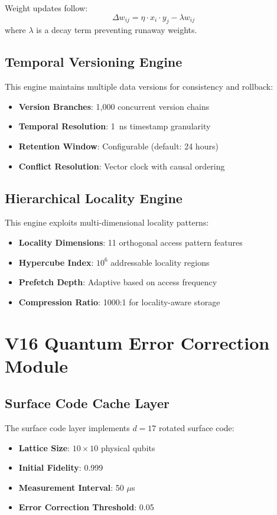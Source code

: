 \documentclass[12pt,a4paper]{article}
\theoremstyle{definition}
\begin{document}
Weight updates follow:
\begin{equation}
\Delta w_{ij} = \eta \cdot x_i \cdot y_j - \lambda w_{ij}
\end{equation}
where $\lambda$ is a decay term preventing runaway weights.

\subsection{Temporal Versioning Engine}
This engine maintains multiple data versions for consistency and rollback:
\begin{itemize}
    \item \textbf{Version Branches}: 1,000 concurrent version chains
    \item \textbf{Temporal Resolution}: 1~ns timestamp granularity
    \item \textbf{Retention Window}: Configurable (default: 24 hours)
    \item \textbf{Conflict Resolution}: Vector clock with causal ordering
\end{itemize}

\subsection{Hierarchical Locality Engine}
This engine exploits multi-dimensional locality patterns:
\begin{itemize}
    \item \textbf{Locality Dimensions}: 11 orthogonal access pattern features
    \item \textbf{Hypercube Index}: $10^6$ addressable locality regions
    \item \textbf{Prefetch Depth}: Adaptive based on access frequency
    \item \textbf{Compression Ratio}: 1000:1 for locality-aware storage
\end{itemize}

\section{V16 Quantum Error Correction Module}\label{sec:v16}

\subsection{Surface Code Cache Layer}
The surface code layer implements $d=17$ rotated surface code:
\begin{itemize}
    \item \textbf{Lattice Size}: $10 \times 10$ physical qubits
    \item \textbf{Initial Fidelity}: 0.999
    \item \textbf{Measurement Interval}: 50 $\mu$s
    \item \textbf{Error Correction Threshold}: 0.05
\end{itemize}
\end{document}
